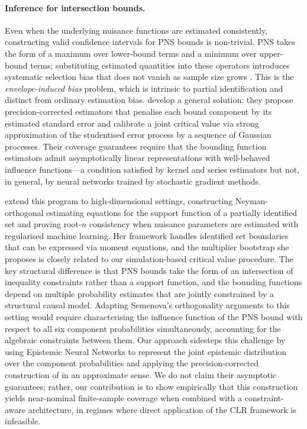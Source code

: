 \documentclass[accepted]{uai2026} %
\theoremstyle{plain}
\theoremstyle{definition}
\theoremstyle{remark}
\begin{document}
\paragraph{Inference for intersection bounds.}
Even when the underlying nuisance functions are estimated consistently,
constructing valid confidence intervals for PNS bounds is non-trivial.
PNS takes the form of a maximum over lower-bound terms and a minimum
over upper-bound terms; substituting estimated quantities into these
operators introduces systematic selection bias that does not vanish as
sample size grows \citep{chernozhukov2013intersection}. This is the
\emph{envelope-induced bias} problem, which is intrinsic to partial
identification and distinct from ordinary estimation bias.
\citet{chernozhukov2013intersection} develop a general solution:
they propose precision-corrected estimators that penalise each bound
component by its estimated standard error and calibrate a joint critical
value via strong approximation of the studentised error process by a
sequence of Gaussian processes. Their coverage guarantees require that
the bounding function estimators admit asymptotically linear
representations with well-behaved influence functions---a condition
satisfied by kernel and series estimators but not, in general, by neural
networks trained by stochastic gradient methods.

\citet{semenova2023debiased} extend this program to high-dimensional
settings, constructing Neyman-orthogonal estimating equations for the
support function of a partially identified set and proving root-$n$
consistency when nuisance parameters are estimated with regularised
machine learning. Her framework handles identified set boundaries that
can be expressed via moment equations, and the multiplier bootstrap she
proposes is closely related to our simulation-based critical value
procedure. The key structural difference is that PNS bounds take the
form of an intersection of inequality constraints rather than a support
function, and the bounding functions depend on multiple probability
estimates that are jointly constrained by a structural causal model.
Adapting Semenova's orthogonality arguments to this setting would
require characterising the influence function of the PNS bound with
respect to all six component probabilities simultaneously, accounting
for the algebraic constraints between them. Our approach sidesteps this
challenge by using Epistemic Neural Networks to represent the joint
epistemic distribution over the component probabilities and applying
the precision-corrected construction of \citet{chernozhukov2013intersection}
in an approximate sense. We do not claim their asymptotic guarantees;
rather, our contribution is to show empirically that this construction
yields near-nominal finite-sample coverage when combined with a
constraint-aware architecture, in regimes where direct application of
the CLR framework is infeasible.
\end{document}
